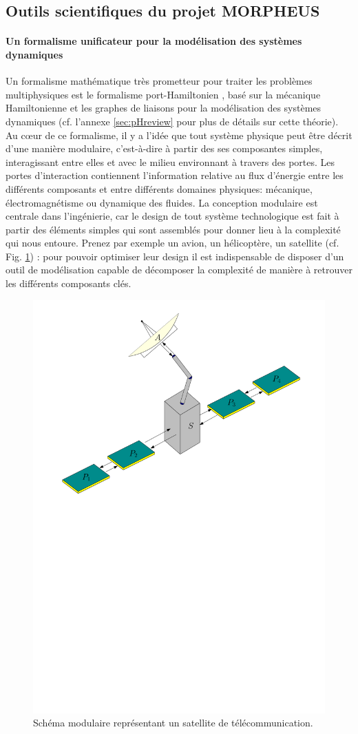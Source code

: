 \documentclass[12pt, french]{article}
\begin{document}
	
	\subsection{Outils scientifiques du projet MORPHEUS}
	
	
	\paragraph{\large Un formalisme unificateur pour la modélisation des systèmes dynamiques\\}
	Un formalisme mathématique très prometteur pour traiter les problèmes multiphysiques est le formalisme port-Hamiltonien \cite{vanderSchaft2002}, basé sur la mécanique Hamiltonienne et les graphes de liaisons pour la modélisation des systèmes dynamiques (cf. l'annexe \ref{sec:pHreview} pour plus de détails sur cette théorie). Au c\oe{}ur de ce formalisme, il y a l'idée que tout système physique peut être décrit d'une manière modulaire, c'est-à-dire à partir des ses composantes simples, interagissant entre elles et avec le milieu environnant à travers des portes. Les portes d'interaction contiennent l'information relative au flux d'énergie entre les différents composants et entre différents domaines physiques: mécanique, électromagnétisme ou dynamique des fluides. La conception modulaire est centrale dans l'ingénierie, car le design de tout système technologique est fait à partir des éléments simples qui sont assemblés pour donner lieu à la complexité qui nous entoure. Prenez par exemple un avion, un hélicoptère, un satellite (cf. Fig. \ref{fig:satellite}) : pour pouvoir optimiser leur design il est indispensable de disposer d'un outil de modélisation capable de décomposer la complexité de manière à retrouver les différents composants clés. 
	
	\begin{figure}[h!b]
		\centering
		\includegraphics[width=.55\textwidth]{satellite.pdf}
		\caption{Schéma modulaire représentant un satellite de télécommunication.}
		\label{fig:satellite}
	\end{figure}
	
\end{document}
